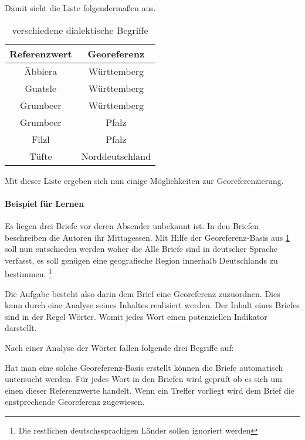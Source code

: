 				Damit sieht die Liste folgendermaßen aus.

				\begin{table}[htpb]
					\caption{verschiedene dialektische Begriffe} 
					\centering
					\begin{tabular}{|c|c|}
						\hline
						Referenzwert & Georeferenz \\
						\hline\hline
						Äbbiera & Württemberg \\
						\hline
						Guatsle & Württemberg \\
						\hline
						Grumbeer & Württemberg \\
						\hline
						Grumbeer & Pfalz \\
						\hline
						Filzl & Pfalz \\
						\hline
						Tüfte & Norddeutschland \\
						\hline
					\end{tabular}
					\label{tab:dialektZwei} 
				\end{table} 

				Mit dieser Liste ergeben sich nun einige Möglichkeiten zur Georeferenzierung.

			

			\paragraph{Beispiel für Lernen} 

				Es liegen drei Briefe vor deren Absender unbekannt ist.
				In den Briefen beschreiben die Autoren ihr Mittagessen. 
				Mit Hilfe der Georeferenz-Basis aus \ref{tab:dialektZwei} soll nun entschieden werden woher die 
				Alle Briefe sind in deutscher Sprache verfasst, es soll genügen eine geografische Region innerhalb Deutschlands zu bestimmen. \footnote{Die restlichen deutschssprachigen Länder sollen ignoriert werden}  

				Die Aufgabe besteht also darin dem Brief eine Georeferenz zuzuordnen. 
				Dies kann durch eine Analyse seines Inhaltes realisiert werden. 
				Der Inhalt eines Briefes sind in der Regel Wörter. 
				Womit jedes Wort einen potenziellen Indikator darstellt.

				Nach einer Analyse der Wörter fallen folgende drei Begriffe auf:

				

				Hat man eine solche Georeferenz-Basis erstellt können die Briefe automatisch untersucht werden.
				Für jedes Wort in den Briefen wird geprüft ob es sich um einen dieser Referenzwerte handelt. 
				Wenn ein Treffer vorliegt wird dem Brief die enstprechende Georeferenz zugewiesen.

